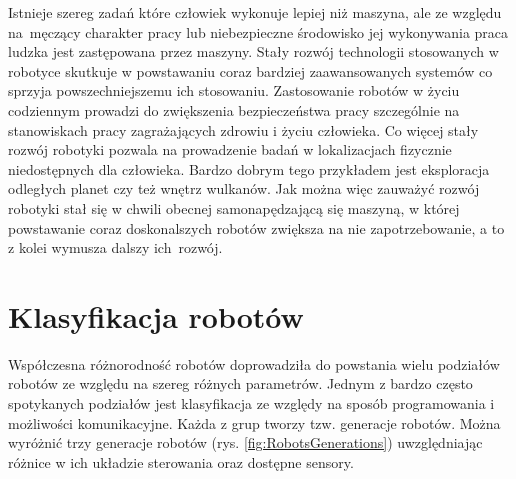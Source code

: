 Istnieje szereg zadań które człowiek wykonuje lepiej niż maszyna, ale ze względu
na~męczący charakter pracy lub niebezpieczne środowisko jej wykonywania praca
ludzka jest zastępowana przez maszyny. Stały rozwój technologii stosowanych w
robotyce skutkuje w powstawaniu coraz bardziej zaawansowanych systemów co sprzyja
powszechniejszemu ich stosowaniu. Zastosowanie robotów w życiu codziennym
prowadzi do zwiększenia bezpieczeństwa pracy szczególnie na stanowiskach pracy
zagrażających zdrowiu i życiu człowieka. Co więcej stały rozwój robotyki pozwala
na prowadzenie badań w lokalizacjach fizycznie niedostępnych dla człowieka.
Bardzo dobrym tego przykładem jest eksploracja odległych planet czy też wnętrz
wulkanów. Jak można więc zauważyć rozwój robotyki stał się w chwili obecnej
samonapędzającą się maszyną, w której powstawanie coraz doskonalszych robotów
zwiększa na nie zapotrzebowanie, a to z kolei wymusza dalszy ich~rozwój.
\newpage\section{Klasyfikacja robotów} Współczesna różnorodność robotów
doprowadziła do powstania wielu podziałów robotów ze względu na szereg różnych
parametrów. Jednym z bardzo często spotykanych podziałów jest klasyfikacja ze
względy na sposób programowania i możliwości komunikacyjne. Każda z grup tworzy
tzw. generacje robotów. Można wyróżnić trzy generacje robotów (rys.
\ref{fig:RobotsGenerations}) uwzględniając różnice w ich układzie sterowania oraz
dostępne sensory\cite{website:robotyka-pl}.
